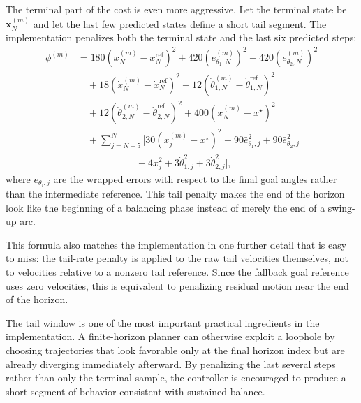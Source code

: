 \documentclass[conference]{IEEEtran}
\begin{document}
The terminal part of the cost is even more aggressive. Let the terminal state be $\bm{x}_N^{(m)}$ and let the last few predicted states define a short tail segment. The implementation penalizes both the terminal state and the last six predicted steps:
\begin{align}
\phi^{(m)} &=
180(x_N^{(m)} - x_N^{\mathrm{ref}})^2
+ 420(e_{\theta_1,N}^{(m)})^2
+ 420(e_{\theta_2,N}^{(m)})^2 \nonumber \\
&\quad + 18(\dot{x}_N^{(m)} - \dot{x}_N^{\mathrm{ref}})^2
+ 12(\dot{\theta}_{1,N}^{(m)} - \dot{\theta}_{1,N}^{\mathrm{ref}})^2 \nonumber \\
&\quad + 12(\dot{\theta}_{2,N}^{(m)} - \dot{\theta}_{2,N}^{\mathrm{ref}})^2
+ 400(x_N^{(m)} - x^\star)^2 \nonumber \\
&\quad + \sum_{j=N-5}^{N} \Big[
30(x_j^{(m)} - x^\star)^2
+ 90 \bar{e}_{\theta_1,j}^2
+ 90 \bar{e}_{\theta_2,j}^2 \nonumber \\
&\qquad\qquad\qquad + 4\dot{x}_j^2 + 3\dot{\theta}_{1,j}^2 + 3\dot{\theta}_{2,j}^2
\Big],
\label{eq:terminalcost}
\end{align}
where $\bar{e}_{\theta_i,j}$ are the wrapped errors with respect to the final goal angles rather than the intermediate reference. This tail penalty makes the end of the horizon look like the beginning of a balancing phase instead of merely the end of a swing-up arc.

This formula also matches the implementation in one further detail that is easy to miss: the tail-rate penalty is applied to the raw tail velocities themselves, not to velocities relative to a nonzero tail reference. Since the fallback goal reference uses zero velocities, this is equivalent to penalizing residual motion near the end of the horizon.

The tail window is one of the most important practical ingredients in the implementation. A finite-horizon planner can otherwise exploit a loophole by choosing trajectories that look favorable only at the final horizon index but are already diverging immediately afterward. By penalizing the last several steps rather than only the terminal sample, the controller is encouraged to produce a short segment of behavior consistent with sustained balance.
\end{document}
